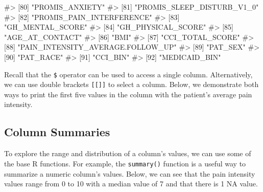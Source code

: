 \documentclass[
  letterpaper,
]{krantz}
\makeatletter
\newenvironment{Shaded}{\begin{snugshade}}{\end{snugshade}}
\newcommand{\CommentTok}[1]{\textcolor[rgb]{0.37,0.37,0.37}{#1}}
\newcommand{\DecValTok}[1]{\textcolor[rgb]{0.68,0.00,0.00}{#1}}
\newcommand{\NormalTok}[1]{\textcolor[rgb]{0.00,0.23,0.31}{#1}}
\newcommand{\SpecialCharTok}[1]{\textcolor[rgb]{0.37,0.37,0.37}{#1}}
\newcommand{\StringTok}[1]{\textcolor[rgb]{0.13,0.47,0.30}{#1}}
\newenvironment{kframe}{%
\medskip{}
\setlength{\fboxsep}{.8em}
 \def\at@end@of@kframe{}%
 \ifinner\ifhmode%
  \def\at@end@of@kframe{\end{minipage}}%
  \begin{minipage}{\columnwidth}%
 \fi\fi%
 \def\FrameCommand##1{\hskip\@totalleftmargin \hskip-\fboxsep
 \colorbox{shadecolor}{##1}\hskip-\fboxsep
     \hskip-\linewidth \hskip-\@totalleftmargin \hskip\columnwidth}%
 \MakeFramed {\advance\hsize-\width
   \@totalleftmargin\z@ \linewidth\hsize
   \@setminipage}}%
 {\par\unskip\endMakeFramed%
 \at@end@of@kframe}
\renewenvironment{Shaded}{\begin{kframe}}{\end{kframe}}
\makeatother
\begin{document}
\begin{Shaded}
\begin{Highlighting}[]
\CommentTok{\#\textgreater{} [80] "PROMIS\_ANXIETY"                  }
\CommentTok{\#\textgreater{} [81] "PROMIS\_SLEEP\_DISTURB\_V1\_0"       }
\CommentTok{\#\textgreater{} [82] "PROMIS\_PAIN\_INTERFERENCE"        }
\CommentTok{\#\textgreater{} [83] "GH\_MENTAL\_SCORE"                 }
\CommentTok{\#\textgreater{} [84] "GH\_PHYSICAL\_SCORE"               }
\CommentTok{\#\textgreater{} [85] "AGE\_AT\_CONTACT"                  }
\CommentTok{\#\textgreater{} [86] "BMI"                             }
\CommentTok{\#\textgreater{} [87] "CCI\_TOTAL\_SCORE"                 }
\CommentTok{\#\textgreater{} [88] "PAIN\_INTENSITY\_AVERAGE.FOLLOW\_UP"}
\CommentTok{\#\textgreater{} [89] "PAT\_SEX"                         }
\CommentTok{\#\textgreater{} [90] "PAT\_RACE"                        }
\CommentTok{\#\textgreater{} [91] "CCI\_BIN"                         }
\CommentTok{\#\textgreater{} [92] "MEDICAID\_BIN"}
\end{Highlighting}
\end{Shaded}

Recall that the \texttt{\$} operator can be used to access a single
column. Alternatively, we can use double brackets \texttt{{[}{[}{]}{]}}
to select a column. Below, we demonstrate both ways to print the first
five values in the column with the patient's average pain intensity.

\begin{Shaded}
\end{Shaded}

\subsection{Column Summaries}\label{column-summaries}

To explore the range and distribution of a column's values, we can use
some of the base R functions. For example, the \texttt{summary()}
function is a useful way to summarize a numeric column's values. Below,
we can see that the pain intensity values range from 0 to 10 with a
median value of 7 and that there is 1 NA value.
\end{document}
